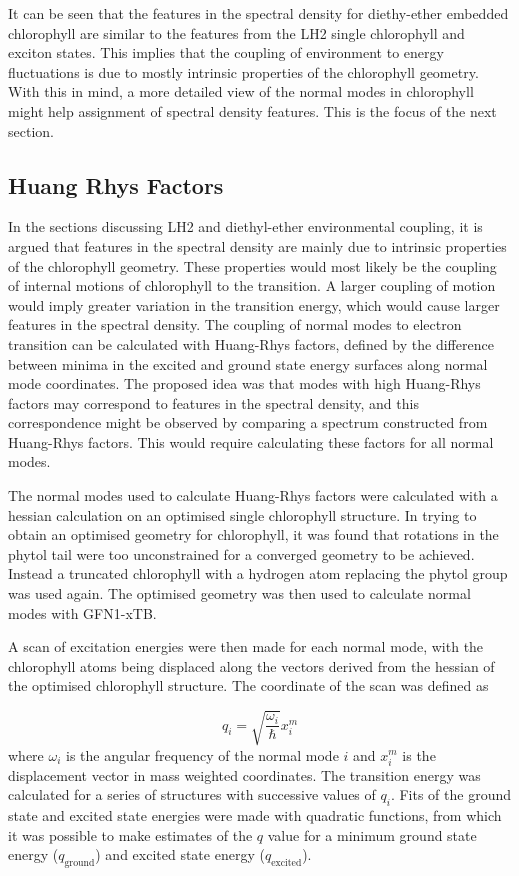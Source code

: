 It can be seen that the features in the spectral density for diethy-ether embedded
chlorophyll are similar to the features from the LH2 single chlorophyll and exciton
states. This implies that the coupling of environment to energy fluctuations is 
due to mostly intrinsic properties of the chlorophyll geometry. With this in mind,
a more detailed view of the normal modes in chlorophyll might help assignment of
spectral density features. This is the focus of the next section.

\subsection{Huang Rhys Factors}
\label{subsec:hrf}

In the sections discussing LH2 and diethyl-ether environmental coupling, it is argued
that features in the spectral density are mainly due to intrinsic properties of 
the chlorophyll geometry. These properties would most likely be the coupling of
internal motions of chlorophyll to the \Qy transition. A larger coupling of motion
would imply greater variation in the \Qy transition energy, which would cause larger 
features in the spectral density. The coupling of normal modes to electron transition
can be calculated with Huang-Rhys factors, defined by the difference between minima
in the excited and ground state energy surfaces along normal mode coordinates. The
proposed idea was that modes with high Huang-Rhys factors may correspond to features
in the spectral density, and this correspondence might be observed by comparing a
spectrum constructed from Huang-Rhys factors. This would require calculating these
factors for all normal modes.

The normal modes used to calculate Huang-Rhys factors were calculated with a hessian
calculation on an optimised single chlorophyll structure. In trying to obtain an
optimised geometry for chlorophyll, it was found that rotations in the phytol tail 
were too unconstrained for a converged geometry to be achieved. Instead a truncated
chlorophyll with a hydrogen atom replacing the phytol group was used again. The 
optimised geometry was then used to calculate normal modes with GFN1-xTB.

A scan of excitation energies were then made for each normal mode, with the chlorophyll
atoms being displaced along the vectors derived from the hessian of the optimised
chlorophyll structure. The coordinate of the scan was defined as 

\begin{equation}
    q_i = \sqrt{\frac{\omega_i}{\hbar}} x^m_i
\end{equation}
%
where $\omega_i$ is the angular frequency of the normal mode $i$ and $x^m_i$ is
the displacement vector in mass weighted coordinates. The \Qy transition energy 
was calculated for a series of structures with successive values of $q_i$. Fits 
of the ground state and excited state energies were made with quadratic functions,
from which it was possible to make estimates of the $q$ value for a minimum ground
state energy ($q_{\text{ground}}$) and excited state energy ($q_{\text{excited}}$).

